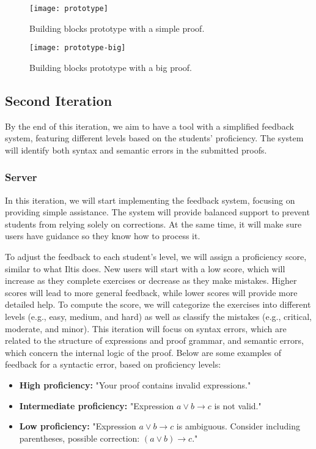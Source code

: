 \begin{figure}[htbp]
    \centering
    \texttt{[image: prototype]}
    \caption{Building blocks prototype with a simple proof.}
    \label{img:building-blocks}
\end{figure}

\begin{figure}[htbp]
    \centering
    \texttt{[image: prototype-big]}
    \caption{Building blocks prototype with a big proof.}
    \label{img:building-blocks-big}
\end{figure}

\subsection{Second Iteration}
By the end of this iteration, we aim to have a tool with a simplified feedback system, featuring different levels based on the students' proficiency. The system will identify both syntax and semantic errors in the submitted proofs.

\subsubsection{Server}
In this iteration, we will start implementing the feedback system, focusing on providing simple assistance. The system will provide balanced support to prevent students from relying solely on corrections. At the same time, it will make sure users have guidance so they know how to process it. 

To adjust the feedback to each student's level, we will assign a proficiency score, similar to what Iltis does. New users will start with a low score, which will increase as they complete exercises or decrease as they make mistakes. Higher scores will lead to more general feedback, while lower scores will provide more detailed help. To compute the score, we will categorize the exercises into different levels (e.g., easy, medium, and hard) as well as classify the mistakes (e.g., critical, moderate, and minor). This iteration will focus on syntax errors, which are related to the structure of expressions and proof grammar, and semantic errors, which concern the internal logic of the proof. Below are some examples of feedback for a syntactic error, based on proficiency levels:
\begin{itemize}
    \item \textbf{High proficiency:} "Your proof contains invalid expressions."
    \item \textbf{Intermediate proficiency:} "Expression \(a \lor b \to c\) is not valid."
    \item \textbf{Low proficiency:} "Expression \(a \lor b \to c\) is ambiguous. Consider including parentheses, possible correction: \((a \lor b) \to c\)."
\end{itemize}

